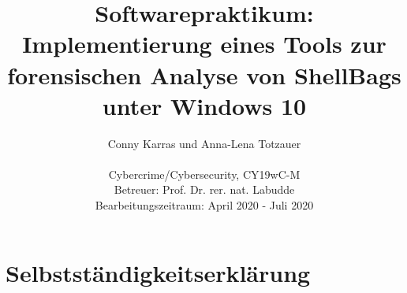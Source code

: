 \documentclass{scrartcl}%
\begin{document}
	\title{Softwarepraktikum: \\ 
		Implementierung eines Tools zur forensischen Analyse von ShellBags unter Windows 10}
	\author{Conny Karras und Anna-Lena Totzauer
		\\
		\\ \small{Cybercrime/Cybersecurity, CY19wC-M}
		\\ \small{Betreuer: Prof. Dr. rer. nat. Labudde}
		\\ \small{Bearbeitungszeitraum: April 2020 - Juli 2020}
		\\ \footnotesize{}}

   	\date{}
	\maketitle
 	\thispagestyle{empty}

	 \newpage 
	 \tableofcontents
	 \thispagestyle{empty}
	
	 \newpage
	 \listoffigures
	 
	 \listoftables
	 \newpage
	 

	
	
	
	
	
	
	

	
	
	
	
	
	
	
	
	
	\newpage
	
	\newpage
	

	
	

	
	\newpage
	\thispagestyle{empty}
	\section*{Selbstständigkeitserklärung}
	\vspace{15mm}
	
\end{document}
